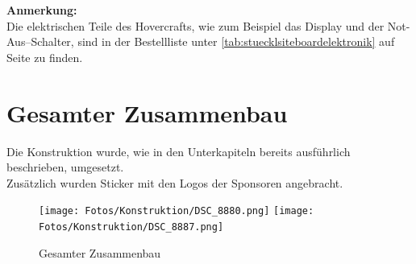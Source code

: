 \textbf{Anmerkung:}\\
Die elektrischen Teile des Hovercrafts, wie zum Beispiel das Display und der Not-Aus--Schalter, sind in der Bestellliste unter \autoref{tab:stuecklsiteboardelektronik} auf Seite \pageref{tab:stuecklsiteboardelektronik} zu finden.

\clearpage
\section{Gesamter Zusammenbau}
Die Konstruktion wurde, wie in den Unterkapiteln bereits ausführlich beschrieben, umgesetzt.\\
Zusätzlich wurden Sticker mit den Logos der Sponsoren angebracht.
\begin{figure}[H]
    \centering
    \texttt{[image: Fotos/Konstruktion/DSC\_8880.png]}
    \texttt{[image: Fotos/Konstruktion/DSC\_8887.png]}
    \caption{Gesamter Zusammenbau}
\end{figure}

